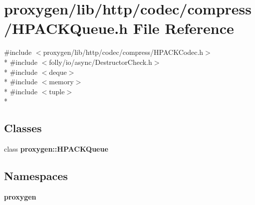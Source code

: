 \section{proxygen/lib/http/codec/compress/\+H\+P\+A\+C\+K\+Queue.h File Reference}
\label{HPACKQueue_8h}
{\ttfamily \#include $<$proxygen/lib/http/codec/compress/\+H\+P\+A\+C\+K\+Codec.\+h$>$}\\*
{\ttfamily \#include $<$folly/io/async/\+Destructor\+Check.\+h$>$}\\*
{\ttfamily \#include $<$deque$>$}\\*
{\ttfamily \#include $<$memory$>$}\\*
{\ttfamily \#include $<$tuple$>$}\\*
\subsection*{Classes}
\begin{DoxyCompactItemize}
\item 
class {\bf proxygen\+::\+H\+P\+A\+C\+K\+Queue}
\end{DoxyCompactItemize}
\subsection*{Namespaces}
\begin{DoxyCompactItemize}
\item 
 {\bf proxygen}
\end{DoxyCompactItemize}
